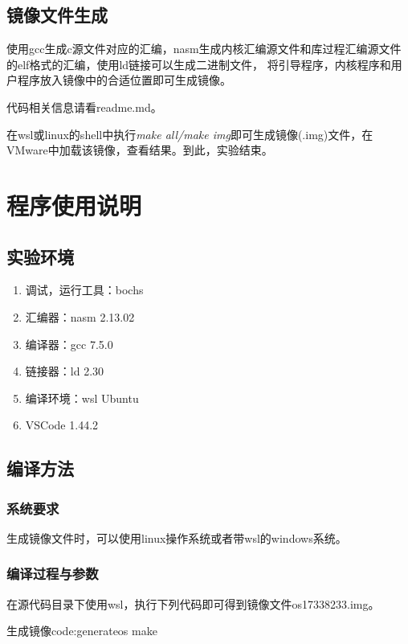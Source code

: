 \documentclass[a4paper, 11pt]{article} %
\newcounter{code}
\begin{document}
\subsection{镜像文件生成}


使用gcc生成c源文件对应的汇编，nasm生成内核汇编源文件和库过程汇编源文件的elf格式的汇编，使用ld链接可以生成二进制文件，
将引导程序，内核程序和用户程序放入镜像中的合适位置即可生成镜像。

代码相关信息请看readme.md。

在wsl或linux的shell中执行\textit{make all/make img}即可生成镜像(.img)文件，在VMware中加载该镜像，查看结果。到此，实验结束。

\section{程序使用说明}
\subsection{实验环境}
\begin{enumerate}
  \item 调试，运行工具：bochs
  \item 汇编器：nasm 2.13.02
  \item 编译器：gcc 7.5.0
  \item 链接器：ld 2.30
  \item 编译环境：wsl Ubuntu
  \item VSCode 1.44.2
\end{enumerate}

\subsection{编译方法}

\subsubsection{系统要求}

生成镜像文件时，可以使用linux操作系统或者带wsl的windows系统。

\subsubsection{编译过程与参数}

在源代码目录下使用wsl，执行下列代码即可得到镜像文件os17338233.img。
\begin{code}{生成镜像}{code:generateos}
make
\end{code}
\end{document}
